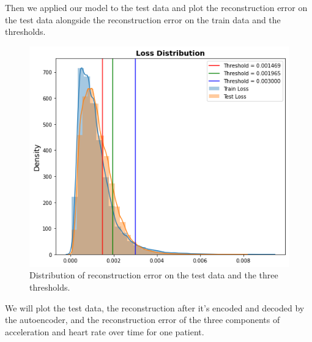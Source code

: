 Then we applied our model to the test data and plot the reconstruction error on the test data alongside the reconstruction error on the train data and the thresholds.

\begin{figure}[H]
\centering
  \includegraphics[scale=0.4]{img/task_2/train_test_loss.png}
  \caption{Distribution of reconstruction error on the test data and the three thresholds.}
  \label{fig: test loss}
\end{figure}

We will plot the test data, the reconstruction after it’s encoded and decoded by the autoencoder, and the reconstruction error of the three components of acceleration and heart rate over time for one patient.

